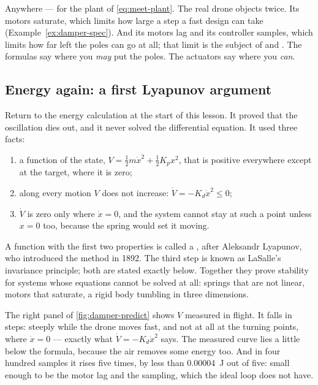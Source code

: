 Anywhere — for the plant of \cref{eq:meet-plant}. The real drone objects twice. Its motors saturate, which limits how large a step a fast design can take (Example~\ref{ex:damper-spec}). And its motors lag and its controller samples, which limits how far left the poles can go at all; that limit is the subject of  and . The formulas say where you \emph{may} put the poles. The actuators say where you \emph{can}.

\subsection{Energy again: a first Lyapunov argument}
Return to the energy calculation at the start of this lesson. It proved that the oscillation dies out, and it never solved the differential equation. It used three facts:
\begin{enumerate}
  \item a function of the state, $V = \tfrac12 m\dot x^2 + \tfrac12 K_p x^2$, that is positive everywhere except at the target, where it is zero;
  \item along every motion $V$ does not increase: $\dot V = -K_d\dot x^2 \le 0$;
  \item $\dot V$ is zero only where $\dot x = 0$, and the system cannot stay at such a point unless $x = 0$ too, because the spring would set it moving.
\end{enumerate}
A function with the first two properties is called a , after Aleksandr Lyapunov, who introduced the method in 1892. The third step is known as LaSalle's invariance principle; both are stated exactly below. Together they prove stability for systems whose equations cannot be solved at all: springs that are not linear, motors that saturate, a rigid body tumbling in three dimensions.

The right panel of \cref{fig:damper-predict} shows $V$ measured in flight. It falls in steps: steeply while the drone moves fast, and not at all at the turning points, where $\dot x = 0$ — exactly what $\dot V = -K_d\dot x^2$ says. The measured curve lies a little below the formula, because the air removes some energy too. And in four hundred samples it rises five times, by less than \SI{0.00004}{J} out of five: small enough to be the motor lag and the sampling, which the ideal loop does not have.

